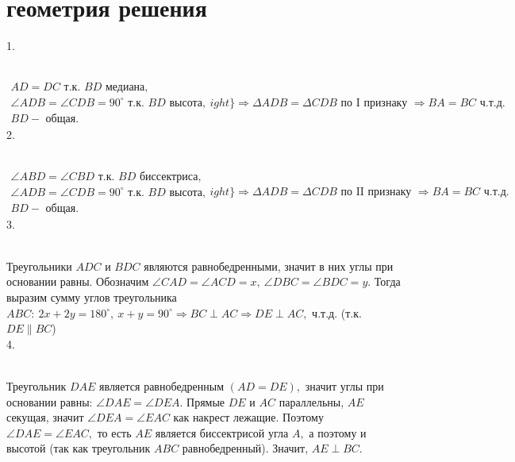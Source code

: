 \section{геометрия решения}
1. \begin{figure}[ht!]
\end{figure}\\
$\left.\begin{array}{l}AD=DC\text{ т.к. }BD\text{ медиана,}\\
\angle ADB=\angle CDB=90^\circ \text{ т.к. }BD\text{ высота,}\\
BD - \text{ общая.}   \end{array}
ight\}\Rightarrow
\Delta ADB=\Delta CDB\text{ по I признаку }\Rightarrow BA=BC\text{ ч.т.д.} $\\
2.  \begin{figure}[ht!]
\end{figure}\\
$\left.\begin{array}{l}\angle ABD=\angle CBD\text{ т.к. }BD\text{ биссектриса,}\\
\angle ADB=\angle CDB=90^\circ \text{ т.к. }BD\text{ высота,}\\
BD - \text{ общая.}   \end{array}
ight\}\Rightarrow
\Delta ADB=\Delta CDB\text{ по II признаку }\Rightarrow BA=BC\text{ ч.т.д.} $\\
3. \begin{figure}[ht!]
\end{figure}\\
Треугольники $ADC$ и $BDC$ являются равнобедренными, значит в них углы при основании равны. Обозначим $\angle CAD=\angle ACD=x,\ \angle DBC=\angle BDC=y.$ Тогда выразим сумму углов треугольника $ABC:\ 2x+2y=180^\circ,\ x+y=90^\circ\Rightarrow BC \perp AC\Rightarrow DE\perp AC,$ ч.т.д. (т.к. $DE\parallel BC$)\\
4. \begin{figure}[ht!]
\end{figure}\\
Треугольник $DAE$ является равнобедренным $(AD=DE),$ значит углы при основании равны: $\angle DAE=\angle DEA.$ Прямые $DE$ и $AC$ параллельны, $AE$ секущая, значит  $\angle DEA=\angle EAC$ как накрест лежащие. Поэтому $\angle DAE=\angle EAC,$ то есть $AE$ является биссектрисой угла $A,$ а поэтому и высотой (так как треугольник $ABC$ равнобедренный). Значит, $AE\perp BC.$\\
